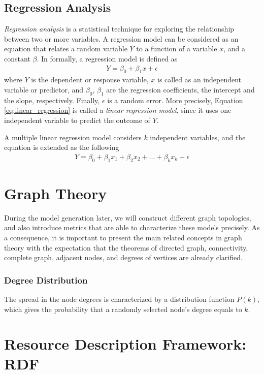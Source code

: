 \subsection{Regression Analysis}

\textit{Regression analysis} is a statistical technique for exploring the relationship between two or more variables. A regression model can be considered as an equation that relates a random variable $Y$ to a function of a variable $x$, and a constant $\beta$. In formally, a regression model is defined as
\begin{align} \label{eq:linear_regression}
	Y = \beta_0 + \beta_1x + \epsilon
\end{align}
where $Y$ is the dependent or response variable, $x$ is called as an independent variable or predictor, and $\beta_0$, $\beta_1$ are the regression coefficients, the intercept and the slope, respectively. Finally, $\epsilon$ is a random error. More precisely, Equation \ref{eq:linear_regression} is called a \textit{linear regression model}, since it uses one independent variable to predict the outcome of $Y$.

A multiple linear regression model considers $k$ independent variables, and the equation is extended as the following
\begin{align}
	Y = \beta_0 + \beta_1x_1 + \beta_2x_2 + \dots + \beta_kx_k + \epsilon
\end{align}

\section{Graph Theory}

During the model generation later, we will construct different graph topologies, and also introduce metrics that are able to characterize these models precisely. As a consequence, it is important to present the main related concepts in graph theory with the expectation that the theorems of directed graph, connectivity, complete graph, adjacent nodes, and degrees of vertices are already clarified.

\subsubsection{Degree Distribution}

The spread in the node degrees is characterized by a distribution
function $P(k)$, which gives the probability that a randomly selected node's degree equals to $k$.


\section{Resource Description Framework: RDF} \label{section:rdf}

